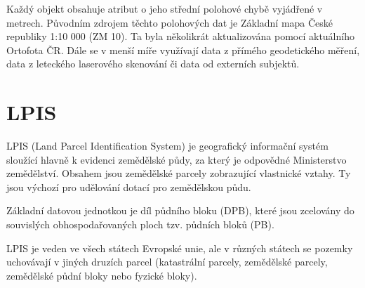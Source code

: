 \documentclass[a4paper,oneside,12pt]{book}
\begin{document}
\hspace{10mm} Každý objekt obsahuje atribut o jeho střední polohové chybě vyjádřené v metrech. Původním zdrojem těchto polohových dat je Základní mapa České republiky 1:10 000 (ZM 10). Ta byla několikrát aktualizována pomocí aktuálního Ortofota ČR. Dále se v menší míře využívají data z přímého geodetického měření, data z leteckého laserového
skenování či data od externích subjektů. \cite{nEFEg7XpI9hVQCiO} 


\section{LPIS} \label{lpis}
\hspace{10mm} LPIS (Land Parcel Identification System) je geografický informační systém sloužící hlavně k evidenci zemědělské půdy, za který je odpovědné Ministerstvo zemědělství. Obsahem jsou zemědělské parcely zobrazující vlastnické vztahy. Ty jsou výchozí pro udělování dotací pro zemědělskou půdu.\cite{Devaty2018}

\hspace{10mm} Základní datovou jednotkou je díl půdního bloku (DPB), které jsou zcelovány do souvislých obhospodařovaných ploch tzv. půdních bloků (PB). \cite{Devaty2018}

\hspace{10mm} LPIS je veden ve všech státech Evropské unie, ale v různých státech se pozemky uchovávají v jiných druzích parcel (katastrální parcely, zemědělské parcely, zemědělské půdní bloky nebo fyzické bloky). \cite{KocurBera2019}
\end{document}
